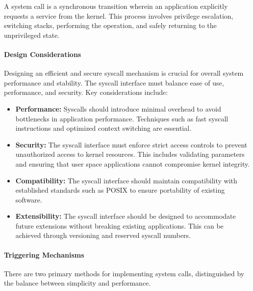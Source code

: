 \documentclass[a4paper,10pt,twoside]{report}
\theoremstyle{definition}
\begin{document}
A system call is a synchronous transition wherein an application explicitly requests a service from the kernel. This process involves privilege escalation, switching stacks, performing the operation, and safely returning to the unprivileged state.

\paragraph{Design Considerations}

Designing an efficient and secure syscall mechanism is crucial for overall system performance and stability. The syscall interface must balance ease of use, performance, and security. Key considerations include:

\begin{itemize}
    \item \textbf{Performance:} Syscalls should introduce minimal overhead to avoid bottlenecks in application performance. Techniques such as fast syscall instructions and optimized context switching are essential.
    \item \textbf{Security:} The syscall interface must enforce strict access controls to prevent unauthorized access to kernel resources. This includes validating parameters and ensuring that user space applications cannot compromise kernel integrity.
    \item \textbf{Compatibility:} The syscall interface should maintain compatibility with established standards such as POSIX to ensure portability of existing software.
    \item \textbf{Extensibility:} The syscall interface should be designed to accommodate future extensions without breaking existing applications. This can be achieved through versioning and reserved syscall numbers.
\end{itemize}

\paragraph{Triggering Mechanisms}

There are two primary methods for implementing system calls, distinguished by the balance between simplicity and performance.
\end{document}
